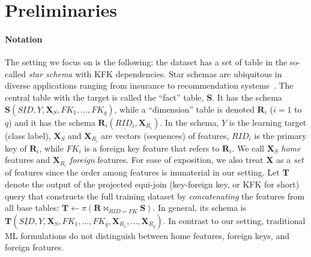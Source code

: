 \documentclass[sigconf]{acmart}
\newcommand{\eat}[1]{}
\begin{document}
\section{Preliminaries}

\paragraph*{\textbf{Notation}}
The setting we focus on is the following: the dataset has a set of table in the so-called \textit{star schema} with KFK dependencies.
Star schemas are ubiquitous in diverse applications ranging from insurance to recommendation systems~\cite{cowbook}.
The central table with the target is called the ``fact'' table, \textbf{S}. It has the schema $\textbf{S}(\underline{SID},Y, \textbf{X}_S, FK_1, \dots, FK_q)$,
while a ``dimension'' table is denoted $\textbf{R}_i$ ($i = 1$ to $q$) and it has the schema $\textbf{R}_i(\underline{RID_i},\textbf{X}_{R_i})$.
In the schema, $Y$ is the learning target (class label), $\textbf{X}_S$ and $\textbf{X}_{R_i}$ are vectors (sequences) of features, $RID_i$ is the primary key
of $\textbf{R}_i$, while $FK_i$ is a foreign key feature that refers to $\textbf{R}_i$. We call $\textbf{X}_S$ \textit{home} features and $\textbf{X}_{R_i}$ \textit{foreign} features.
For ease of exposition, we also treat \textbf{X} as a \textit{set} of features since the order among features is immaterial in our setting.
Let \textbf{T} denote the output of the projected equi-join (key-foreign key, or KFK for short) query that constructs the full training dataset by 
\textit{concatenating} the features from all base tables: $\textbf{T} \leftarrow \pi(\textbf{R} \bowtie_{RID=FK} \textbf{S})$. In general, its schema is 
$\textbf{T}(\underline{SID},Y,\textbf{X}_S,FK_1,\dots,FK_q,\textbf{X}_{R_1},\dots,\textbf{X}_{R_q})$.
In contrast to our setting, traditional ML formulations do not distinguish between home features, foreign keys, and foreign features.
\eat{\footnote{Note that this setting is 
different from the statistical relational learning (SRL) setting in which the joins could violate the IID assumption because they are not KFK (labeled examples in \textbf{S}
might get duplicated. KFK joins do not cause such repetitions.}}
\end{document}
